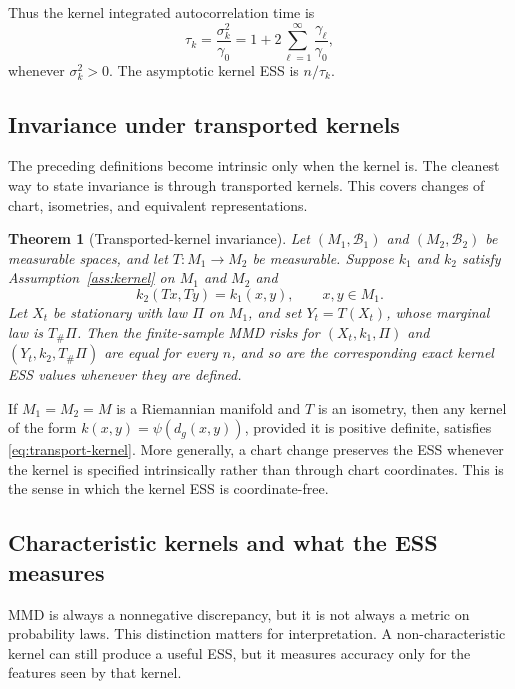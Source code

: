 \documentclass[11pt]{article}
\newtheorem{theorem}{Theorem}
\newcommand{\1}{\mathbf{1}}
\begin{document}
Thus the kernel integrated autocorrelation time is
\[
\tau_k=\frac{\sigma_k^2}{\gamma_0}=1+2\sum_{\ell=1}^\infty\frac{\gamma_\ell}{\gamma_0},
\]
whenever $\sigma_k^2>0$. The asymptotic kernel ESS is $n/\tau_k$.

\subsection{Invariance under transported kernels}

The preceding definitions become intrinsic only when the kernel is. The cleanest way to state invariance is through transported kernels. This covers changes of chart, isometries, and equivalent representations.

\begin{theorem}[Transported-kernel invariance]
\label{thm:transport}
Let $(M_1,\mathscr B_1)$ and $(M_2,\mathscr B_2)$ be measurable spaces, and let $T:M_1\to M_2$ be measurable. Suppose $k_1$ and $k_2$ satisfy Assumption~\ref{ass:kernel} on $M_1$ and $M_2$ and
\begin{equation}
\label{eq:transport-kernel}
k_2(Tx,Ty)=k_1(x,y),\qquad x,y\in M_1.
\end{equation}
Let $X_t$ be stationary with law $\Pi$ on $M_1$, and set $Y_t=T(X_t)$, whose marginal law is $T_\#\Pi$. Then the finite-sample MMD risks for $(X_t,k_1,\Pi)$ and $(Y_t,k_2,T_\#\Pi)$ are equal for every $n$, and so are the corresponding exact kernel ESS values whenever they are defined.
\end{theorem}

If $M_1=M_2=M$ is a Riemannian manifold and $T$ is an isometry, then any kernel of the form $k(x,y)=\psi(d_g(x,y))$, provided it is positive definite, satisfies \eqref{eq:transport-kernel}. More generally, a chart change preserves the ESS whenever the kernel is specified intrinsically rather than through chart coordinates. This is the sense in which the kernel ESS is coordinate-free.

\subsection{Characteristic kernels and what the ESS measures}

MMD is always a nonnegative discrepancy, but it is not always a metric on probability laws. This distinction matters for interpretation. A non-characteristic kernel can still produce a useful ESS, but it measures accuracy only for the features seen by that kernel.
\end{document}
